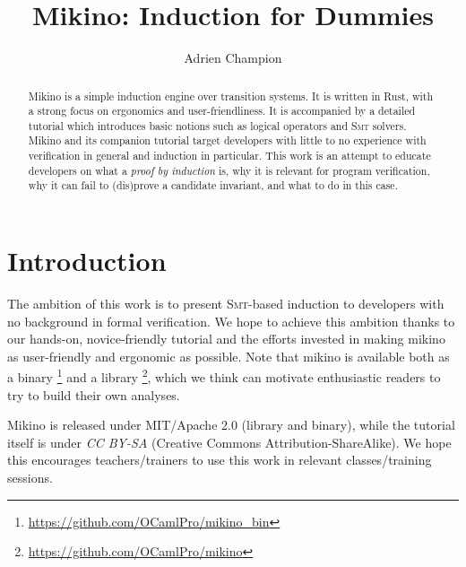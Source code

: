 \documentclass{easychair}
\title{%
    Mikino: Induction for Dummies%
}
\author{%
    Adrien Champion%
}
\institute{%
    OCamlPro,\\%
    \email{adrien.champion@ocamlpro.com}%
}
\newcommand{\Mkn}{Mikino}
\newcommand{\mkn}{mikino}
\newcommand{\rust}{Rust}
\newcommand{\smt}{\textsc{Smt}}
\newcommand{\ita}[1]{\textit{#1}}
\begin{document}
\maketitle

\begin{abstract}
    \Mkn{} is a simple induction engine over transition systems. It is written in \rust{}, with a
    strong focus on ergonomics and user-friendliness. It is accompanied by a detailed tutorial
    which introduces basic notions such as logical operators and \smt{} solvers. \Mkn{} and its
    companion tutorial target developers with little to no experience with verification in general
    and induction in particular. This work is an attempt to educate developers on what a \ita{proof
    by induction} is, why it is relevant for program verification, why it can fail to (dis)prove a
    candidate invariant, and what to do in this case.
\end{abstract}



\section{Introduction}%
\label{sec:intro}


The ambition of this work is to present \smt{}-based induction to developers with no background in
formal verification. We hope to achieve this ambition thanks to our hands-on, novice-friendly
tutorial and the efforts invested in making \mkn{} as user-friendly and ergonomic as possible.
%
Note that \mkn{} is available both as a binary%
%
\footnote{%
    \url{https://github.com/OCamlPro/mikino_bin}%
}
%
and a library%
%
\footnote{
    \url{https://github.com/OCamlPro/mikino}%
},
%
which we think can motivate enthusiastic readers to try to build their own analyses.

\Mkn{} is released under \textsc{MIT}/Apache \(2.0\) (library and binary), while the tutorial
itself is under \ita{CC BY-SA} (Creative Commons Attribution-ShareAlike). We hope this encourages
teachers/trainers to use this work in relevant classes/training sessions.
\end{document}
